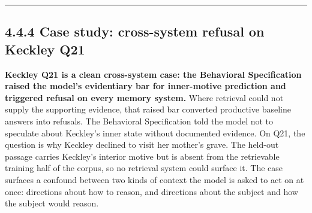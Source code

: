 \begin{center}\rule{0.5\linewidth}{0.5pt}\end{center}

\hypertarget{case-study-cross-system-refusal-on-keckley-q21}{%
\subsection{4.4.4 Case study: cross-system refusal on Keckley
Q21}\label{case-study-cross-system-refusal-on-keckley-q21}}

\textbf{Keckley Q21 is a clean cross-system case: the Behavioral
Specification raised the model's evidentiary bar for inner-motive
prediction and triggered refusal on every memory system.} Where
retrieval could not supply the supporting evidence, that raised bar
converted productive baseline answers into refusals. The Behavioral
Specification told the model not to speculate about Keckley's inner
state without documented evidence. On Q21, the question is why Keckley
declined to visit her mother's grave. The held-out passage carries
Keckley's interior motive but is absent from the retrievable training
half of the corpus, so no retrieval system could surface it. The case
surfaces a confound between two kinds of context the model is asked to
act on at once: directions about how to reason, and directions about the
subject and how the subject would reason.


